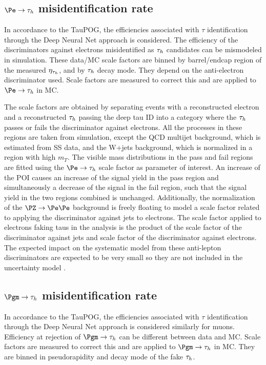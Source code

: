 \subsection{$\Pe \rightarrow \tauh$ misidentification rate}

In accordance to the TauPOG, the efficiencies associated with $\tau$ identification through the Deep Neural Net approach is considered. 
The efficiency of the discriminators against electrons misidentified as $\tau_h$ candidates can be mismodeled in simulation. 
These data/MC scale factors are
binned by barrel/endcap region of the measured $\eta_{\tau_h}$, and by $\tau_h$ decay mode. They depend on the anti-electron discriminator used. 
Scale factors are measured to correct this and are applied to $\Pe \rightarrow \tauh$ in MC. 

The scale factors are obtained by separating events with a reconstructed electron and a reconstructed $\tau_h$ passing 
the deep tau ID into a category where the $\tau_h$ passes or fails the discriminator against electrons. All the processes in 
these regions are taken from simulation, except the QCD multijet background, which is estimated from SS data, and the W+jets background, which is normalized in a region with high $m_T$. The visible mass distributions in the pass and fail regions are fitted using the $\Pe\to\tauh$ scale factor as parameter of interest. An increase of the POI causes an increase of the signal yield in the pass region and simultaneously a decrease of the signal in the fail region, such that the signal yield in the two regions combined is unchanged. Additionally, the normalization of the $\PZ\to\Pe\Pe$ background is freely floating to model a scale factor related to applying the discriminator against jets to electrons. The scale factor applied to electrons faking taus in the analysis is the product of the scale factor of the discriminator against jets and scale factor of the discriminator against electrons. 
The expected impact on the systematic model from these anti-lepton discriminators are expected to be very small so they are not included in the uncertainty model .

\subsection{$\Pgm\rightarrow\tauh$ misidentification rate}

In accordance to the TauPOG, the efficiencies associated with $\tau$ identification through the Deep Neural Net approach is considered similarly for muons.
Efficiency at rejection of $\Pgm\to\tauh$ can be different between data and MC\cite{TAUIDTwiki}. Scale factors are measured to correct this
and are applied to $\Pgm\to\tauh$ in MC. They are binned in pseudorapidity and decay mode of the fake $\tau_h$.  

